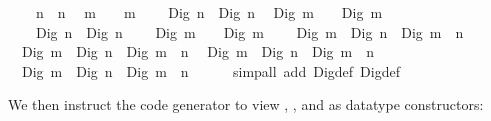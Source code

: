 \begin{isabellebody}
\ \ {\isachardoublequoteopen}{}\ {\isacharplus}\ n\ {\isacharequal}\ n{\isachardoublequoteclose}\isanewline
\ \ {\isachardoublequoteopen}m\ {\isacharplus}\ {}\ {\isacharequal}\ m{\isachardoublequoteclose}\isanewline
\ \ {\isachardoublequoteopen}{}\ {\isacharplus}\ Dig{}\ n\ {\isacharequal}\ Dig{}\ n{\isachardoublequoteclose}\isanewline
\ \ {\isachardoublequoteopen}Dig{}\ m\ {\isacharplus}\ {}\ {\isacharequal}\ Dig{}\ m{\isachardoublequoteclose}\isanewline
\ \ {\isachardoublequoteopen}{}\ {\isacharplus}\ Dig{}\ n\ {\isacharequal}\ Dig{}\ {\isacharparenleft}n\ {\isacharplus}\ {}{\isacharparenright}{\isachardoublequoteclose}\isanewline
\ \ {\isachardoublequoteopen}Dig{}\ m\ {\isacharplus}\ {}\ {\isacharequal}\ Dig{}\ {\isacharparenleft}m\ {\isacharplus}\ {}{\isacharparenright}{\isachardoublequoteclose}\isanewline
\ \ {\isachardoublequoteopen}Dig{}\ m\ {\isacharplus}\ Dig{}\ n\ {\isacharequal}\ Dig{}\ {\isacharparenleft}m\ {\isacharplus}\ n{\isacharparenright}{\isachardoublequoteclose}\isanewline
\ \ {\isachardoublequoteopen}Dig{}\ m\ {\isacharplus}\ Dig{}\ n\ {\isacharequal}\ Dig{}\ {\isacharparenleft}m\ {\isacharplus}\ n{\isacharparenright}{\isachardoublequoteclose}\isanewline
\ \ {\isachardoublequoteopen}Dig{}\ m\ {\isacharplus}\ Dig{}\ n\ {\isacharequal}\ Dig{}\ {\isacharparenleft}m\ {\isacharplus}\ n{\isacharparenright}{\isachardoublequoteclose}\isanewline
\ \ {\isachardoublequoteopen}Dig{}\ m\ {\isacharplus}\ Dig{}\ n\ {\isacharequal}\ Dig{}\ {\isacharparenleft}m\ {\isacharplus}\ n\ {\isacharplus}\ {}{\isacharparenright}{\isachardoublequoteclose}\isanewline
%
\isadelimproof
\ \ %
\endisadelimproof
%
\isatagproof
{}\isamarkupfalse%
\ {\isacharparenleft}simp{\isacharunderscore}all\ add{\isacharcolon}\ Dig{}{\isacharunderscore}def\ Dig{}{\isacharunderscore}def{\isacharparenright}%
\endisatagproof
{\isafoldproof}%
%
\isadelimproof
%
\endisadelimproof
%
\begin{isamarkuptext}%
\noindent We then instruct the code generator to view ,
  ,  and  as
  datatype constructors:%
\end{isamarkuptext}%
\isamarkuptrue%
\isamarkupfalse%

\end{isabellebody}
